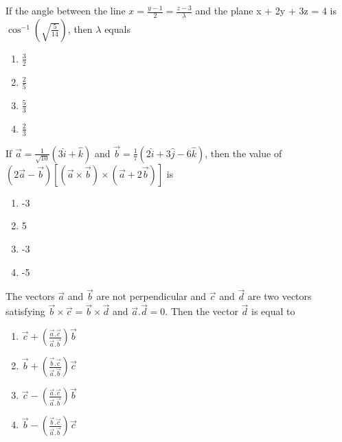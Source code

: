 \item If the angle between the line $x = \frac{y - 1}{2} = \frac{z - 3}{\lambda}$ and the plane x + 2y + 3z = 4 is 
$\cos^{-1}(\sqrt{\frac{5}{14}})$, then $\lambda$ equals
\begin{enumerate}
\item $\frac{3}{2}$
\item $\frac{2}{5}$
\item $\frac{5}{3}$
\item $\frac{2}{3}$
\end{enumerate}

\item If $\overrightarrow{a} = \frac{1}{\sqrt{10}}(3\hat{i} + \hat{k})$ and $\overrightarrow{b} = \frac{1}{7}(2\hat{i}+3\hat{j} - 6\hat{k})$, then the value of $(2\overrightarrow{a} - \overrightarrow{b})[(\overrightarrow{a} \times \overrightarrow{b}) \times (\overrightarrow{a} + 2\overrightarrow{b})]$ is
\begin{enumerate}
\item -3
\item 5
\item -3
\item -5
\end{enumerate}

\item The vectors $\overrightarrow{a}$ and $\overrightarrow{b}$ are not perpendicular and $\overrightarrow{c}$  and $\overrightarrow{d}$ are two vectors satisfying $\overrightarrow{b} \times \overrightarrow{c} = \overrightarrow{b} \times \overrightarrow{d}$ and $\overrightarrow{a}.\overrightarrow{d} = 0$. Then the vector $\overrightarrow{d}$ is equal to
\begin{enumerate}
\item $\overrightarrow{c} + (\frac{\overrightarrow{a}.\overrightarrow{c}}{\overrightarrow{a}.\overrightarrow{b}})\overrightarrow{b}$
\item $\overrightarrow{b} + (\frac{\overrightarrow{b}.\overrightarrow{c}}{\overrightarrow{a}.\overrightarrow{b}})\overrightarrow{c}$
\item $\overrightarrow{c} - (\frac{\overrightarrow{a}.\overrightarrow{c}}{\overrightarrow{a}.\overrightarrow{b}})\overrightarrow{b}$
\item $\overrightarrow{b} - (\frac{\overrightarrow{b}.\overrightarrow{c}}{\overrightarrow{a}.\overrightarrow{b}})\overrightarrow{c}$
\end{enumerate}


